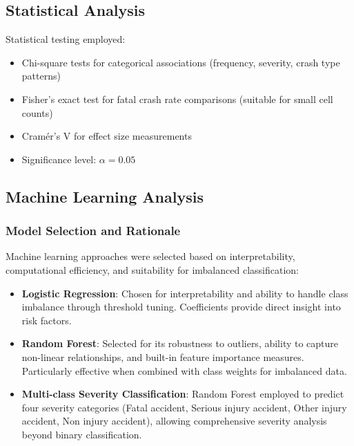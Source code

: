 \documentclass[12pt,a4paper]{article}
\begin{document}
\subsection{Statistical Analysis}
Statistical testing employed:
\begin{itemize}
    \item Chi-square tests for categorical associations (frequency, severity, crash type patterns)
    \item Fisher's exact test for fatal crash rate comparisons (suitable for small cell counts)
    \item Cramér's V for effect size measurements
    \item Significance level: $\alpha = 0.05$
\end{itemize}

\subsection{Machine Learning Analysis}

\subsubsection{Model Selection and Rationale}
Machine learning approaches were selected based on interpretability, computational efficiency, and suitability for imbalanced classification:
\begin{itemize}
    \item \textbf{Logistic Regression}: Chosen for interpretability and ability to handle class imbalance through threshold tuning. Coefficients provide direct insight into risk factors.
    \item \textbf{Random Forest}: Selected for its robustness to outliers, ability to capture non-linear relationships, and built-in feature importance measures. Particularly effective when combined with class weights for imbalanced data.
    \item \textbf{Multi-class Severity Classification}: Random Forest employed to predict four severity categories (Fatal accident, Serious injury accident, Other injury accident, Non injury accident), allowing comprehensive severity analysis beyond binary classification.
\end{itemize}
\end{document}
